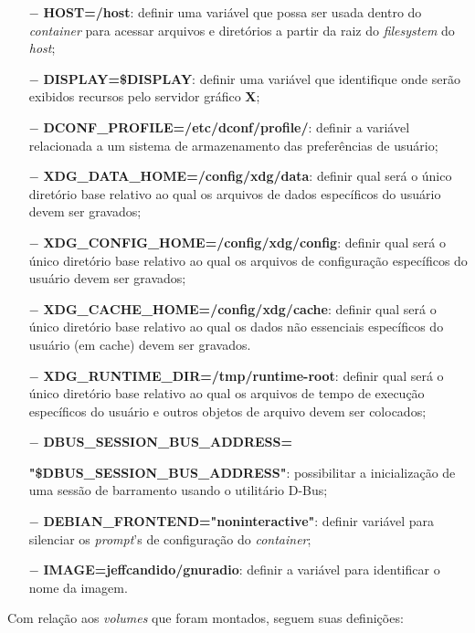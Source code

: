 \documentclass[
  12pt,				%
  openright,			%
  twoside,			%
  a4paper,			%
  english,			%
  french,				%
  spanish,			%
  brazil,				%
  ]{abntex2}
\begin{document}
\begin{itemize}
  \item[$-$] \textbf{HOST=/host}: definir uma variável que possa ser usada dentro do \textit{container} para acessar
        arquivos e diretórios a partir da raiz do \textit{filesystem} do \textit{host};
  \item[$-$] \textbf{DISPLAY=\$DISPLAY}: definir uma variável que identifique onde serão exibidos recursos pelo servidor gráfico \textbf{X};
  \item[$-$] \textbf{DCONF\_PROFILE=/etc/dconf/profile/}: definir a variável relacionada a um sistema de armazenamento das
        preferências de usuário;
  \item[$-$] \textbf{XDG\_DATA\_HOME=/config/xdg/data}: definir qual será o único diretório base relativo ao qual os arquivos
        de dados específicos do usuário devem ser gravados;
  \item[$-$] \textbf{XDG\_CONFIG\_HOME=/config/xdg/config}: definir qual será o único diretório base relativo ao qual os arquivos
        de configuração específicos do usuário devem ser gravados;
  \item[$-$] \textbf{XDG\_CACHE\_HOME=/config/xdg/cache}: definir qual será o único diretório base relativo ao qual os dados não
        essenciais específicos do usuário (em cache) devem ser gravados.
  \item[$-$] \textbf{XDG\_RUNTIME\_DIR=/tmp/runtime-root}: definir qual será o único diretório base relativo ao qual os arquivos de
        tempo de execução específicos do usuário e outros objetos de arquivo devem ser colocados;
  \item[$-$] \textbf{DBUS\_SESSION\_BUS\_ADDRESS=}

        \textbf{"\$DBUS\_SESSION\_BUS\_ADDRESS"}: possibilitar a inicialização de uma sessão de barramento usando o utilitário D-Bus;
  \item[$-$] \textbf{DEBIAN\_FRONTEND="noninteractive"}: definir variável para silenciar os \textit{prompt}'s de configuração do \textit{container};
  \item[$-$] \textbf{IMAGE=jeffcandido/gnuradio}: definir a variável para identificar o nome da imagem.
\end{itemize}

Com relação aos \textit{volumes} que foram montados, seguem suas definições:
\end{document}

